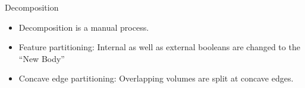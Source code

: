 \begin{frame}{Decomposition}

\begin{itemize}[noitemsep,label=\textbullet,topsep=2pt,parsep=2pt,partopsep=2pt]
\item Decomposition is a manual process. 
\item Feature partitioning:  Internal as well as external booleans  are changed to the ``New Body''
\item Concave edge partitioning:  Overlapping volumes are split at concave edges.
\end{itemize}


\def\myfigenlosuredefeaturecolumnwidth{0.95}
\def\myfigenlosureabelcolumnwidth{0.98}
\begin{tabular}[h]{@{} p{0.15\linewidth}  p{0.38\linewidth} p{0.15\linewidth} p{0.2\linewidth}@{}} \midrule


\end{tabular}
\end{frame}
